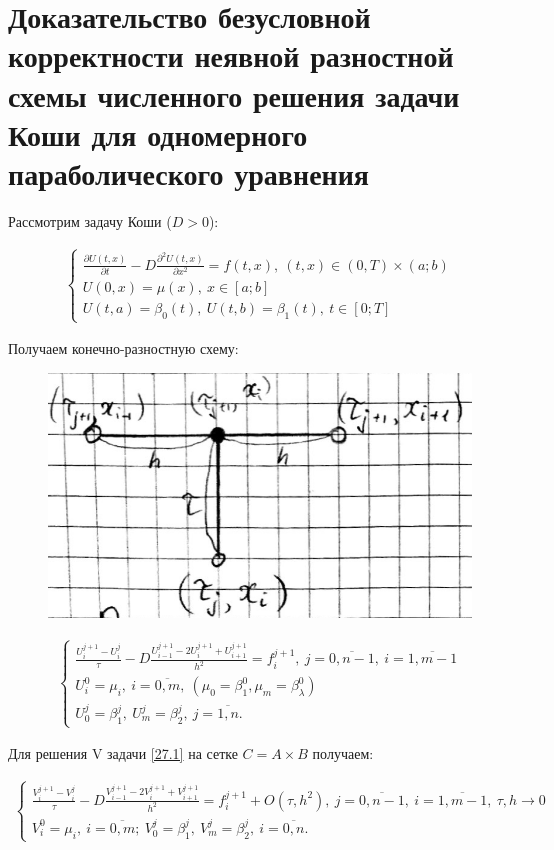 \documentclass[__main__.tex]{subfiles}
\begin{document}
\section{Доказательство безусловной корректности неявной разностной схемы численного решения задачи Коши для одномерного параболического уравнения}

Рассмотрим задачу Коши ($D>0$):

\begin{gather}\label{27.1}
\begin{cases}
\frac{\partial U \left(t,x\right)}{\partial t} - D \frac{\partial^2 U \left( t,x \right)}{\partial x^2} = f \left( t,x \right), \ \left(t,x\right) \in \left(0,T\right) \times \left( a;b \right) \\
U\left(0,x\right) = \mu \left(x\right), \ x \in \left[a;b\right] \\
U(t,a) = \beta_0 \left(t\right), \ U\left( t,b \right) = \beta_1 \left(t\right), \ t\in\left[0;T\right]
\end{cases}
\end{gather}

Получаем конечно-разностную схему:

\begin{figure}[h!]
	\centering
	\includegraphics[width=0.03\linewidth]{img/img_27-1}
	\caption{}
	\label{img_27.1}
\end{figure}

\begin{gather}\label{27.2}
\begin{cases}
\frac{U^{j+1}_i - U^j_i}{\tau} - D \frac{U^{j+1}_{i-1} - 2 U^{j+1}_i+U^{j+1}_{i+1}}{h^2} = f^{j+1}_i, \ j = \overline{0,n-1}, \ i = \overline{1,m-1} \\
U^0_i = \mu_i, \ i = \overline{0,m}, \ \left( \mu_0 = \beta^0_1, \mu_m = \beta^0_\lambda \right) \\
U^j_0 = \beta^j_1, \ U^j_m = \beta^j_2, \ j = \overline{1,n}.
\end{cases}
\end{gather}

Для решения V задачи \ref{27.1} на сетке $C = A \times B$ получаем:

\begin{gather} \label{27.3}
\begin{cases}
\frac{V^{j+1}_i - V^j_i}{\tau} - D \frac{V^{j+1}_{i-1} - 2V^{j+1}_i +V^{j+1}_{i+1}}{h^2} = f^{j+1}_i + O \left( \tau, h^2 \right), \ j = \overline{0,n-1}, \ i = \overline{1,m-1}, \ \tau, h \rightarrow 0 \\
V^0_i = \mu_i, \ i = \overline{0,m}; \ V^j_0 = \beta^j_1, \ V^j_m = \beta^j_2, \ i= \overline{0,n}.
\end{cases}
\end{gather}
\end{document}
